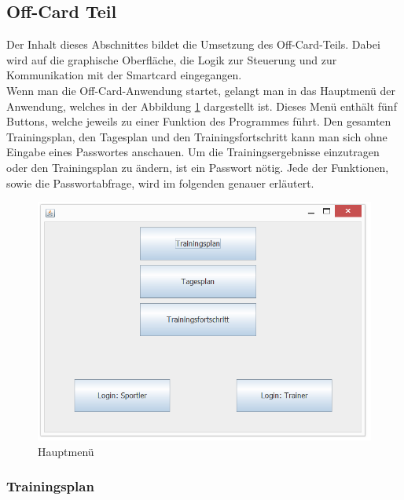 
\subsection{Off-Card Teil}
\label{subsec:3.3}


Der Inhalt dieses Abschnittes bildet die Umsetzung des Off-Card-Teils. Dabei wird auf die graphische Oberfläche, die Logik zur Steuerung und zur Kommunikation mit der Smartcard eingegangen. \\
\newline
Wenn man die Off-Card-Anwendung startet, gelangt man in das Hauptmenü der Anwendung, welches in der Abbildung \ref{main}  dargestellt ist. Dieses Menü enthält fünf Buttons, welche jeweils zu einer Funktion des Programmes führt. Den gesamten Trainingsplan, den Tagesplan und den Trainingsfortschritt kann man sich ohne Eingabe eines Passwortes anschauen. Um die Trainingsergebnisse einzutragen oder den Trainingsplan zu ändern, ist ein Passwort nötig. Jede der Funktionen, sowie die Passwortabfrage, wird im folgenden genauer erläutert.

\begin{figure}[h]
\includegraphics[width=1\hsize]{./images/main.png}
\caption{Hauptmenü}
\label{main}
\end{figure}



\subsubsection*{Trainingsplan}

